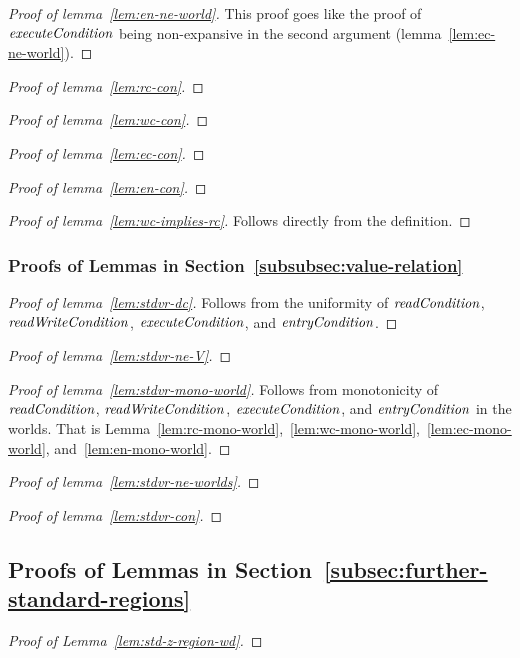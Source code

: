 \documentclass{article}
\newcommand{\plainfun}[2]{
  \ifthenelse{\equal{#2}{}}
             {\mathit{#1}}
             {\mathit{#1}(#2)}
}
\newcommand{\readCond}[1]{\plainfun{readCondition}{#1}}
\newcommand{\writeCond}[1]{\plainfun{readWriteCondition}{#1}}
\newcommand{\execCond}[1]{\plainfun{executeCondition}{#1}}
\newcommand{\entryCond}[1]{\plainfun{entryCondition}{#1}}
\begin{document}
\begin{appendices}
\begin{proof}[Proof of lemma~\ref{lem:en-ne-world}]
  This proof goes like the proof of $\execCond{}$ being non-expansive in the second argument (lemma~\ref{lem:ec-ne-world}).
\end{proof}
 
\begin{proof}[Proof of lemma~\ref{lem:rc-con}]
\end{proof}

\begin{proof}[Proof of lemma~\ref{lem:wc-con}]
\end{proof}

\begin{proof}[Proof of lemma~\ref{lem:ec-con}]
\end{proof}

\begin{proof}[Proof of lemma~\ref{lem:en-con}]
\end{proof}

\begin{proof}[Proof of lemma~\ref{lem:wc-implies-rc}]
  Follows directly from the definition.
\end{proof}


\subsubsection{Proofs of Lemmas in Section~\ref{subsubsec:value-relation}}
\begin{proof}[Proof of lemma~\ref{lem:stdvr-dc}]
  Follows from the uniformity of $\readCond{}$, $\writeCond{}$, $\execCond{}$, and $\entryCond{}$.
\end{proof}

\begin{proof}[Proof of lemma~\ref{lem:stdvr-ne-V}]
\end{proof}

\begin{proof}[Proof of lemma~\ref{lem:stdvr-mono-world}]
  Follows from monotonicity of $\readCond{}$, $\writeCond{}$, $\execCond{}$, and $\entryCond{}$ in the worlds. That is Lemma~\ref{lem:rc-mono-world},~\ref{lem:wc-mono-world},~\ref{lem:ec-mono-world}, and~\ref{lem:en-mono-world}.
\end{proof}

\begin{proof}[Proof of lemma~\ref{lem:stdvr-ne-worlds}]
\end{proof}

\begin{proof}[Proof of lemma~\ref{lem:stdvr-con}]
\end{proof}


\subsection{Proofs of Lemmas in Section~\ref{subsec:further-standard-regions}}


\begin{proof}[Proof of Lemma~\ref{lem:std-z-region-wd}]
\end{proof}
\end{appendices}
\end{document}
